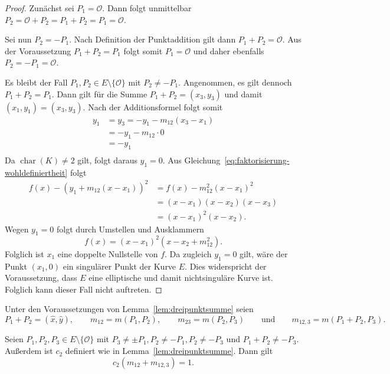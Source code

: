 \begin{proof}
    Zunächst sei $P_1=\mathcal{O}$. Dann folgt unmittelbar \(P_2=\mathcal{O}+P_2=P_1+P_2=P_1=\mathcal{O}\).

    Sei nun $P_2=-P_1$. Nach Definition der Punktaddition gilt dann \(P_1+P_2=\mathcal{O}\). Aus der Voraussetzung $P_1+P_2=P_1$ folgt somit $   P_1=\mathcal{O}$ und daher ebenfalls $P_2=-P_1=\mathcal{O}$.

    Es bleibt der Fall \(P_1,P_2\in E\setminus\{\mathcal{O}\}\) mit \(P_2\neq-P_1\). Angenommen, es gilt dennoch $P_1+P_2=P_1$. Dann gilt für die Summe $P_1+P_2=(x_3,y_3)$ und damit $(x_1,y_1)=(x_3,y_3)$.
    Nach der Additionsformel folgt somit
    \begin{align*}
        y_1 & =y_3=-y_1-m_{12}(x_3-x_1) \\
            & =-y_1-m_{12}\cdot 0       \\
            & = -y_1                    \\
    \end{align*}
    Da \(\operatorname{char}(K)\neq2\) gilt, folgt daraus \(y_1=0\).
    Aus Gleichung~\eqref{eq:faktorisierung-wohldefiniertheit} folgt
    \begin{align*}
        f(x)-{\left(y_1+m_{12}(x-x_1)\right)}^2
         & = f(x)-m_{12}^2{(x-x_1)}^2 \\
         & = (x-x_1)(x-x_2)(x-x_3)    \\
         & = {(x-x_1)}^2(x-x_2).
    \end{align*}
    Wegen \(y_1=0\) folgt durch Umstellen und Ausklammern
    \[
        f(x)
        =
        {(x-x_1)}^2
        \left(x-x_2+m_{12}^2\right).
    \]
    Folglich ist $x_1$ eine doppelte Nullstelle von $f$. Da zugleich $y_1=0$ gilt, wäre der Punkt $(x_1,0)$ ein singulärer Punkt der Kurve $E$. Dies widerspricht der Voraussetzung, dass $E$ eine elliptische und damit nichtsinguläre Kurve ist. Folglich kann dieser Fall nicht auftreten.
\end{proof}
Unter den Voraussetzungen von Lemma~\ref{lem:dreipunktsumme} seien
\[
    P_1+P_2=(\hat{x},\hat{y}),\qquad
    m_{12}=m(P_1,P_2),\qquad
    m_{23}=m(P_2,P_3)\qquad \text{und} \qquad m_{12,3}=m(P_1+P_2,P_3).
\]
\begin{hilfssatz}\label{hilfs:steigungsidentitaet}
    Seien $P_1,P_2,P_3\in E\setminus\{\mathcal{O}\}$ mit $P_3 \neq \pm P_1,P_2\neq -P_1,P_2\neq -P_3$ und $P_1+P_2\neq -P_3$. Außerdem ist $c_2$ definiert wie in Lemma~\ref{lem:dreipunktsumme}. Dann gilt
    \[
        c_2(m_{12}+m_{12,3})=1.
    \]
\end{hilfssatz}


